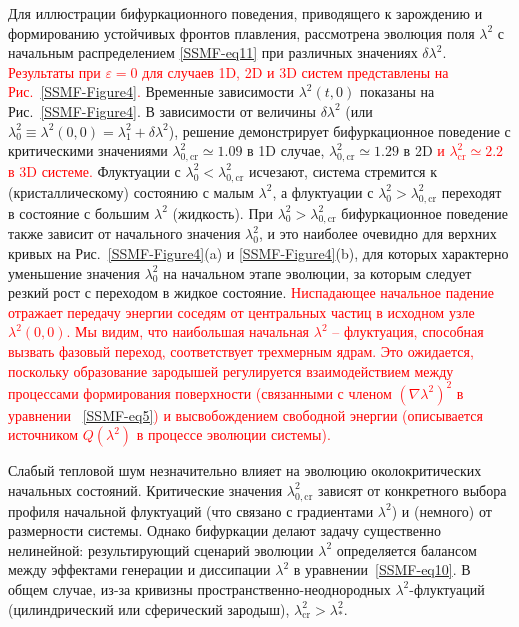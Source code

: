 Для иллюстрации бифуркационного поведения, приводящего к зарождению и формированию устойчивых фронтов плавления, рассмотрена эволюция поля $\lambda^2$ с начальным распределением \eqref{SSMF-eq11} при различных значениях $ \delta\lambda^2$.
\textcolor{red}{Результаты при $ \varepsilon = 0 $ для случаев 1D, 2D и 3D систем представлены на Рис.~\ref{SSMF-Figure4}.}
Временные зависимости $\lambda^2(t, 0) $ показаны на Рис.~\ref{SSMF-Figure4}.
В зависимости от величины $\delta\lambda^2$ (или $\lambda_0^2 \equiv \lambda^2(0,0)=\lambda_1^2 + \delta \lambda^2$), решение демонстрирует бифуркационное поведение с критическими значениями $\lambda^2_{0,\mathrm{cr}} \simeq 1.09$ в 1D случае, $\lambda^2_{0,\mathrm{cr}}\simeq 1.29$ в 2D \textcolor{red}{и $\lambda^2_{\mathrm{cr}}\simeq 2.2$ в 3D системе.}
Флуктуации с $ \lambda_0 ^ 2 <\lambda ^ 2_ {0, \mathrm{cr}} $ исчезают, система стремится к (кристаллическому) состоянию с малым $\lambda^2$, а флуктуации с $\lambda_0^2> \lambda^2_{0, \mathrm{cr}}$ переходят в состояние с большим $\lambda^2$ (жидкость).
При $\lambda_0^2>\lambda^2_{0, \mathrm{cr}}$ бифуркационное поведение также зависит от начального значения $\lambda_0^2$, и это наиболее очевидно для верхних кривых на Рис.~\ref{SSMF-Figure4}(a) и \ref{SSMF-Figure4}(b), для которых характерно уменьшение значения $ \lambda_0^2 $ на начальном этапе эволюции, за которым следует резкий рост с переходом в жидкое состояние.
\textcolor{red}{Ниспадающее начальное падение отражает передачу энергии соседям от центральных частиц в исходном узле $\lambda^2 (0,0)$. Мы видим, что наибольшая начальная $\lambda ^ 2$ -- флуктуация, способная вызвать фазовый переход, соответствует трехмерным ядрам. Это ожидается, поскольку образование зародышей регулируется взаимодействием между процессами формирования поверхности (связанными с членом $(\nabla \lambda ^ 2) ^ 2$ в уравнении ~\eqref{SSMF-eq5}) и высвобождением свободной энергии (описывается источником $Q (\lambda ^ 2)$ в процессе эволюции системы).}

Слабый тепловой шум незначительно влияет на эволюцию околокритических начальных состояний.
Критические значения $\lambda^2_{0,\mathrm{cr}}$ зависят от конкретного выбора профиля начальной флуктуаций (что связано с градиентами $\lambda^2$) и (немного) от размерности системы.
Однако бифуркации делают задачу существенно нелинейной:
результирующий сценарий эволюции $\lambda^2$ определяется балансом между эффектами генерации и диссипации $\lambda^2$ в уравнении~\eqref{SSMF-eq10}.
В общем случае, из-за кривизны пространственно-неоднородных $\lambda^2$-флуктуаций (цилиндрический или сферический зародыш), $\lambda_{\mathrm{cr}}^2 > \lambda_\ast^2$.





